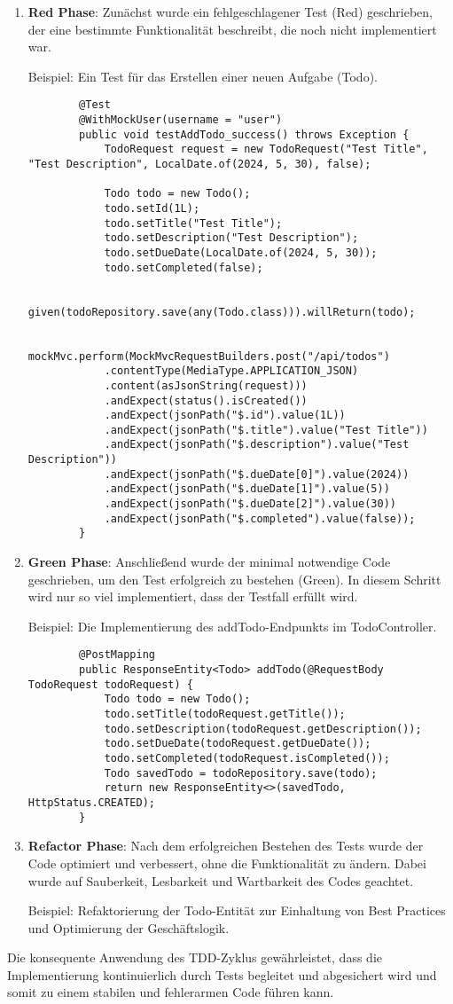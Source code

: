 \begin{enumerate}
	\item \textbf{Red Phase}: Zunächst wurde ein fehlgeschlagener Test (Red) geschrieben, der eine bestimmte Funktionalität beschreibt, die noch nicht implementiert war.
	
	Beispiel: Ein Test für das Erstellen einer neuen Aufgabe (Todo).
	\begin{lstlisting}
		@Test
		@WithMockUser(username = "user")
		public void testAddTodo_success() throws Exception {
			TodoRequest request = new TodoRequest("Test Title", "Test Description", LocalDate.of(2024, 5, 30), false);
			
			Todo todo = new Todo();
			todo.setId(1L);
			todo.setTitle("Test Title");
			todo.setDescription("Test Description");
			todo.setDueDate(LocalDate.of(2024, 5, 30));
			todo.setCompleted(false);
			
			given(todoRepository.save(any(Todo.class))).willReturn(todo);
			
			mockMvc.perform(MockMvcRequestBuilders.post("/api/todos")
			.contentType(MediaType.APPLICATION_JSON)
			.content(asJsonString(request)))
			.andExpect(status().isCreated())
			.andExpect(jsonPath("$.id").value(1L))
			.andExpect(jsonPath("$.title").value("Test Title"))
			.andExpect(jsonPath("$.description").value("Test Description"))
			.andExpect(jsonPath("$.dueDate[0]").value(2024))
			.andExpect(jsonPath("$.dueDate[1]").value(5))
			.andExpect(jsonPath("$.dueDate[2]").value(30))
			.andExpect(jsonPath("$.completed").value(false));
		}
	\end{lstlisting}
	
	\item \textbf{Green Phase}: Anschließend wurde der minimal notwendige Code geschrieben, um den Test erfolgreich zu bestehen (Green). In diesem Schritt wird nur so viel implementiert, dass der Testfall erfüllt wird.
	
	Beispiel: Die Implementierung des addTodo-Endpunkts im TodoController.
	\begin{lstlisting}
		@PostMapping
		public ResponseEntity<Todo> addTodo(@RequestBody TodoRequest todoRequest) {
			Todo todo = new Todo();
			todo.setTitle(todoRequest.getTitle());
			todo.setDescription(todoRequest.getDescription());
			todo.setDueDate(todoRequest.getDueDate());
			todo.setCompleted(todoRequest.isCompleted());
			Todo savedTodo = todoRepository.save(todo);
			return new ResponseEntity<>(savedTodo, HttpStatus.CREATED);
		}
	\end{lstlisting}
	
	\item \textbf{Refactor Phase}: Nach dem erfolgreichen Bestehen des Tests wurde der Code optimiert und verbessert, ohne die Funktionalität zu ändern. Dabei wurde auf Sauberkeit, Lesbarkeit und Wartbarkeit des Codes geachtet.
	
	Beispiel: Refaktorierung der Todo-Entität zur Einhaltung von Best Practices und Optimierung der Geschäftslogik.
	
\end{enumerate}

Die konsequente Anwendung des TDD-Zyklus gewährleistet, dass die Implementierung kontinuierlich durch Tests begleitet und abgesichert wird und somit zu einem stabilen und fehlerarmen Code führen kann.
